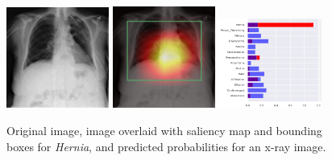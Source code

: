 \documentclass[8pt]{beamer}
\begin{document}
\begin{frame}
\begin{figure}[H]
  \centering
  \includegraphics[width=0.3\textwidth]{images/preds/hernia}\hspace{0.01\textwidth}%
  \includegraphics[width=0.3\textwidth]{images/preds/hernia_cam}\hspace{0.01\textwidth}%
  \includegraphics[width=0.3\textwidth]{images/preds/hernia_probs}\\[0.01\textwidth]
  \caption{Original image, image overlaid with saliency map and bounding boxes
    for \emph{Hernia}, and predicted probabilities for an x-ray image.}
  \label{examples_14}
\end{figure}
\end{frame}
\end{document}

